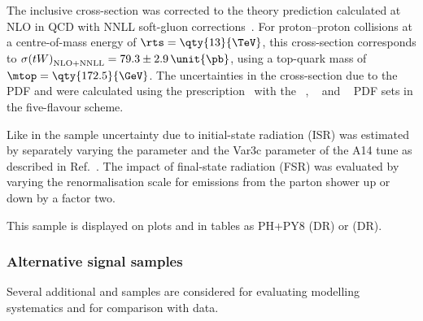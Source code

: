 The inclusive cross-section was corrected to the theory prediction
calculated at NLO in QCD with NNLL soft-gluon
corrections~\cite{Kidonakis:2021vob}.  For proton--proton  %
collisions at a centre-of-mass energy of \(\rts = \qty{13}{\TeV}\), this
cross-section corresponds to \(\sigma{(tW)}_{\mathrm{NLO+NNLL}} = 79.3 \pm 2.9\,\unit{\pb}\),
using a top-quark mass of \(\mtop = \qty{172.5}{\GeV}\).
The uncertainties in the cross-section due to the PDF and \alphas were
calculated using the \PDFforLHC[15] prescription~\cite{Butterworth:2015oua}
with the \MMHT[nnlo]~\cite{Harland-Lang:2014zoa},
\CT[14nnlo]~\cite{Dulat:2015mca} and \NNPDF[3.0lo]~\cite{Ball:2014uwa}
PDF sets in the five-flavour scheme.

Like in the \ttbar sample uncertainty due to initial-state radiation (ISR)
was estimated by separately varying the \hdamp parameter and
the Var3c parameter of the A14 tune
as described in Ref.~\cite{ATL-PHYS-PUB-2017-007}. The impact of
final-state radiation (FSR) was evaluated by varying the renormalisation scale
for emissions from the parton shower up or down by a factor two.

This sample is displayed on plots and in tables as PH+PY8 (DR) or \tW (DR).

\subsubsection{Alternative signal samples}%
\label{sec:datamc:mc_alt_signal} 

Several additional \ttbar and \tW samples are considered for evaluating modelling systematics and for comparison with data. 

